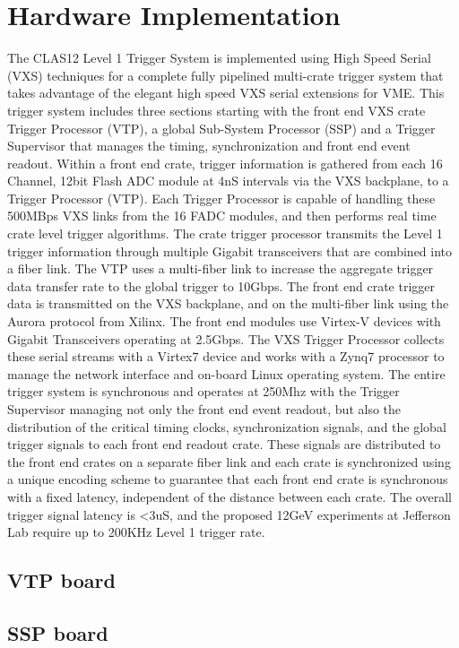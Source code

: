 \section{Hardware Implementation}

The CLAS12 Level 1 Trigger System is implemented using High Speed Serial (VXS) techniques for a complete fully pipelined multi-crate trigger system that takes advantage of the elegant high speed VXS serial extensions for VME.  This trigger system includes three sections starting with the front end VXS crate Trigger Processor (VTP), a global Sub-System Processor (SSP) and a Trigger Supervisor that manages the timing, synchronization and front end event readout.  
Within a front end crate, trigger information is gathered from each 16 Channel, 12bit Flash ADC module at 4nS intervals via the VXS backplane, to a Trigger Processor (VTP).  Each Trigger Processor is capable of handling these 500MBps VXS links from the 16 FADC modules, and then performs real time crate level trigger algorithms.  The crate trigger processor transmits the Level 1 trigger information through multiple Gigabit transceivers that are combined into a fiber link.  The VTP uses a multi-fiber link to increase the aggregate trigger data transfer rate to the global trigger to 10Gbps.
The front end crate trigger data is transmitted on the VXS backplane, and on the multi-fiber link using the Aurora protocol from Xilinx.  The front end modules use Virtex-V devices with Gigabit Transceivers operating at 2.5Gbps. The VXS Trigger Processor collects these serial streams with a Virtex7 device and works with a Zynq7 processor to manage the network interface and on-board Linux operating system.
The entire trigger system is synchronous and operates at 250Mhz with the Trigger Supervisor managing not only the front end event readout, but also the distribution of the critical timing clocks, synchronization signals, and the global trigger signals to each front end readout crate.  These signals are distributed to the front end crates on a separate fiber link and each crate is synchronized using a unique encoding scheme to guarantee that each front end crate is synchronous with a fixed latency, independent of the distance between each crate.  The overall trigger signal latency is <3uS, and the proposed 12GeV experiments at Jefferson Lab require up to 200KHz Level 1 trigger rate.

\subsection{VTP board}


\subsection{SSP board}
